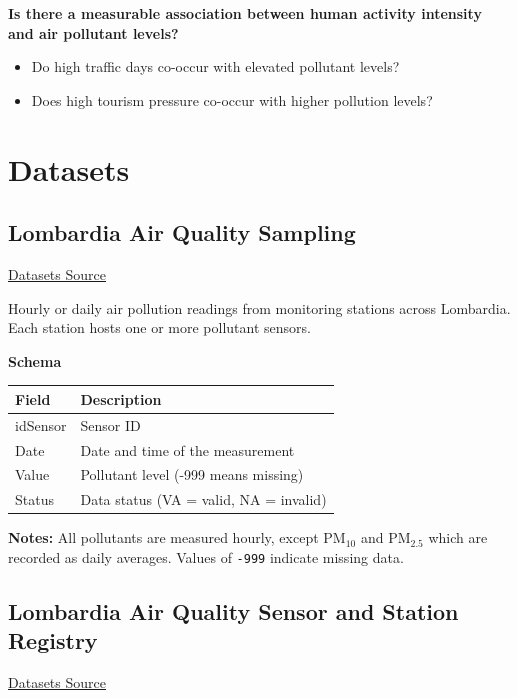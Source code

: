 \documentclass{article}
\begin{document}
	\textbf{Is there a measurable association between human activity intensity and air pollutant levels?}
	\begin{itemize}
		\item Do high traffic days co-occur with elevated pollutant levels?
		\item Does high tourism pressure co-occur with higher pollution levels?
	\end{itemize}
	
	\newpage
	\section{Datasets}

	\subsection{Lombardia Air Quality Sampling}
	
	\href{https://www.dati.Lombardia.it/Ambiente/Dati-sensori-aria-dal-2018/g2hp-ar79/about_data}{Datasets Source}
	
	Hourly or daily air pollution readings from monitoring stations across Lombardia. Each station hosts one or more pollutant sensors.
	
	\textbf{Schema}
		
	\begin{table}[H]
		\centering
		\begin{tabular}{ll}
			\hline
			Field & Description \\
			\hline
			idSensor & Sensor ID \\
			Date & Date and time of the measurement \\
			Value & Pollutant level (-999 means missing) \\
			Status & Data status (VA = valid, NA = invalid) \\
			\hline
		\end{tabular}
	\end{table}
	
	\textbf{Notes:} All pollutants are measured hourly, except PM$_{10}$ and PM$_{2.5}$ which are recorded as daily averages. Values of \texttt{-999} indicate missing data.
	
	\subsection{Lombardia Air Quality Sensor and Station Registry}
	
	\href{https://www.dati.Lombardia.it/Ambiente/Stazioni-qualit-dell-aria/ib47-atvt/about_data}{Datasets Source}
	
\end{document}
